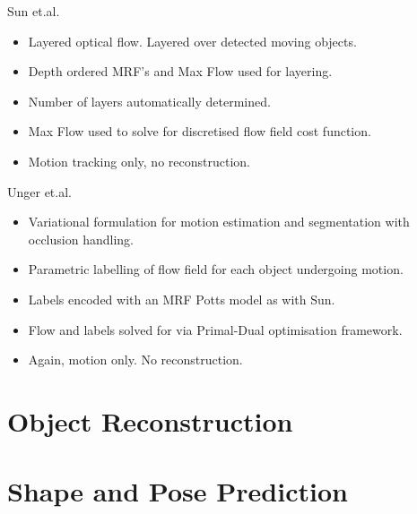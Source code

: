 Sun et.al. \cite{Sun2012}
\begin{itemize}
	\item Layered optical flow. Layered over detected moving objects.
	\item Depth ordered MRF's and Max Flow used for layering.%
	\item Number of layers automatically determined.
	\item Max Flow used to solve for discretised flow field cost function.
	\item Motion tracking only, no reconstruction.
\end{itemize}

Unger et.al. \cite{Unger2012}
\begin{itemize}
	\item Variational formulation for motion estimation and segmentation with occlusion handling.
	\item Parametric labelling of flow field for each object undergoing motion.
	\item Labels encoded with an MRF Potts model as with Sun. %
	\item Flow and labels solved for via Primal-Dual optimisation framework. %
	\item Again, motion only. No reconstruction.
\end{itemize}

\section{Object Reconstruction}
\label{sec:lit_review_obj_recon}

\section{Shape and Pose Prediction}
\label{sec:lit_review_prediction}